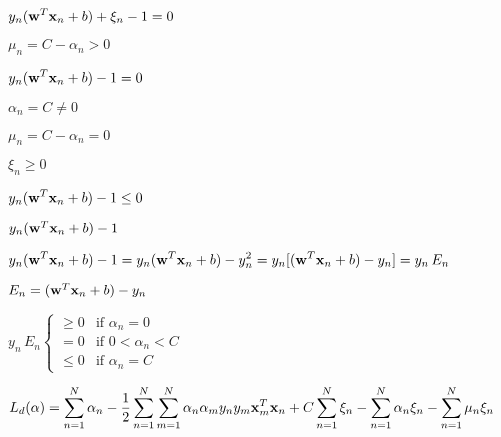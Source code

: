 \documentclass{article}
\def\lthtmlcheckvsize{\ifdim\ht\sizebox<\vsize 
  \ifdim\wd\sizebox<\hsize\expandafter\hfill\fi \expandafter\vfill
  \else\expandafter\vss\fi}%
\begin{document}
{\newpage\clearpage
{}%
$\displaystyle y_n({\bf w}^T{\bf x}_n+b)+\xi_n-1=0$%
\lthtmlindisplaymathZ
\lthtmlcheckvsize\clearpage}

{\newpage\clearpage
{}%
$ \mu_n=C-\alpha_n>0$%
\lthtmlindisplaymathZ
\lthtmlcheckvsize\clearpage}

{\newpage\clearpage
{}%
$\displaystyle y_n({\bf w}^T{\bf x}_n+b)-1=0$%
\lthtmlindisplaymathZ
\lthtmlcheckvsize\clearpage}

{\newpage\clearpage
{}%
$ \alpha_n=C\ne 0$%
\lthtmlindisplaymathZ
\lthtmlcheckvsize\clearpage}

{\newpage\clearpage
{}%
$ \mu_n=C-\alpha_n=0$%
\lthtmlindisplaymathZ
\lthtmlcheckvsize\clearpage}

{\newpage\clearpage
{}%
$ \xi_n\ge 0$%
\lthtmlindisplaymathZ
\lthtmlcheckvsize\clearpage}

{\newpage\clearpage
{}%
$\displaystyle y_n({\bf w}^T{\bf x}_n+b)-1\le 0$%
\lthtmlindisplaymathZ
\lthtmlcheckvsize\clearpage}

{\newpage\clearpage
{}%
$ y_n({\bf w}^T{\bf x}_n+b)-1$%
\lthtmlindisplaymathZ
\lthtmlcheckvsize\clearpage}

{\newpage\clearpage
{}%
$\displaystyle y_n({\bf w}^T{\bf x}_n+b)-1=y_n({\bf w}^T{\bf x}_n+b)-y_n^2
=y_n[({\bf w}^T{\bf x}_n+b)-y_n]=y_n\,E_n$%
\lthtmlindisplaymathZ
\lthtmlcheckvsize\clearpage}

{\newpage\clearpage
{}%
$ E_n=({\bf w}^T{\bf x}_n+b)-y_n$%
\lthtmlindisplaymathZ
\lthtmlcheckvsize\clearpage}

{\newpage\clearpage
{}%
$\displaystyle y_n\,E_n \left\{\begin{array}{ll}\ge 0 & \mbox{if }\alpha_n=0\\
= 0 & \mbox{if }0<\alpha_n<C\\\le 0 & \mbox{if }\alpha_n=C
\end{array}\right.$%
\lthtmlindisplaymathZ
\lthtmlcheckvsize\clearpage}

{\newpage\clearpage
{}%
$\displaystyle L_d({\bf\alpha})=\sum_{n=1}^N\alpha_n
-\frac{1}{2}\sum_{n=1}^N\sum_{m=1}^N \alpha_n\alpha_m y_ny_m{\bf x}_m^T{\bf x}_n
+C\sum_{n=1}^N \xi_n-\sum_{n=1}^N \alpha_n\xi_n-\sum_{n=1}^N  \mu_n\xi_n$%
\lthtmlindisplaymathZ
\lthtmlcheckvsize\clearpage}
\end{document}
